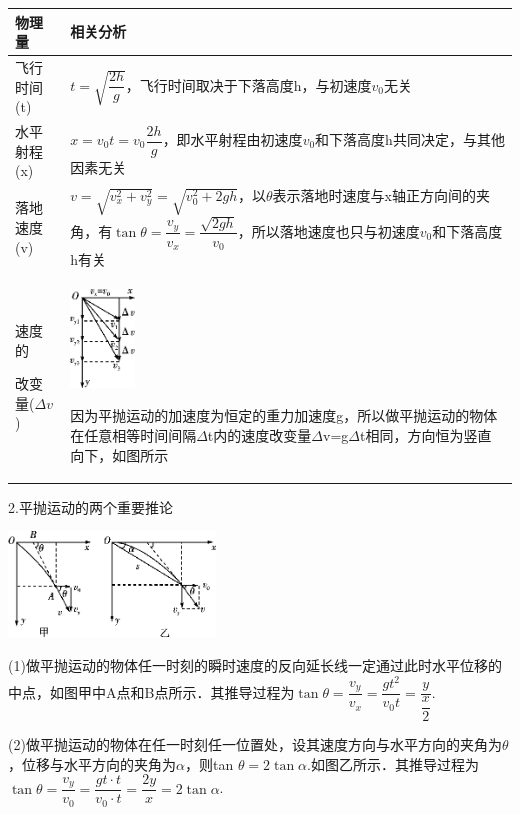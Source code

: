 \documentclass[cn,10.5pt,chinese,mac,chinesefont=founder]{elegantbook}
\begin{document}
\begin{longtable}[]{@{}m{2cm}m{10cm}@{}}
\toprule
物理量 & 相关分析\tabularnewline
\midrule
\endhead
飞行时间(t) 
&
$t=\sqrt{\dfrac{2h}{g}}$，飞行时间取决于下落高度h，与初速度$v_0$无关\tabularnewline
水平射程(x) 
&
$x=v_0t=v_0\dfrac{2h}{g}$，即水平射程由初速度$v_0$和下落高度h共同决定，与其他因素无关\tabularnewline
落地速度(v) 
& $v=\sqrt{v_x^2+v_y^2}=\sqrt{v_0^2+2gh}$，以$\theta$表示落地时速度与x轴正方向间的夹角，有$\tan\theta=\dfrac{v_y}{v_x} =\dfrac{\sqrt{2gh}}{v_0} $，所以落地速度也只与初速度$v_0$和下落高度h有关\tabularnewline

速度的

改变量($\Delta v$)
& \begin{minipage}[t]{0.7\columnwidth}\raggedright
\includegraphics[width=0.67708in,height=1.03125in]{media/image161.png}

因为平抛运动的加速度为恒定的重力加速度g，所以做平抛运动的物体在任意相等时间间隔$\Delta$t内的速度改变量$\Delta$v=g$\Delta$t相同，方向恒为竖直向下，如图所示\strut
\end{minipage}\tabularnewline
\bottomrule
\end{longtable}

2.平抛运动的两个重要推论

\begin{center}\includegraphics[width=2.16667in,height=1.10417in]{media/image162.png}
	
\end{center}

(1)做平抛运动的物体任一时刻的瞬时速度的反向延长线一定通过此时水平位移的中点，如图甲中A点和B点所示．其推导过程为$\tan \theta=\dfrac{v_{y}}{v_{x}}=\dfrac{g t^{2}}{v_{0} t}=\dfrac{y}{\dfrac{x}{2}}$.

(2)做平抛运动的物体在任一时刻任一位置处，设其速度方向与水平方向的夹角为$\theta$，位移与水平方向的夹角为$\alpha$，则tan
$\theta=2\tan \alpha$.如图乙所示．其推导过程为$\tan\theta=\dfrac{v_{y}}{v_{0}}=\dfrac{g t \cdot t}{v_{0} \cdot t}=\dfrac{2 y}{x}=2 \tan \alpha$.
\end{document}
